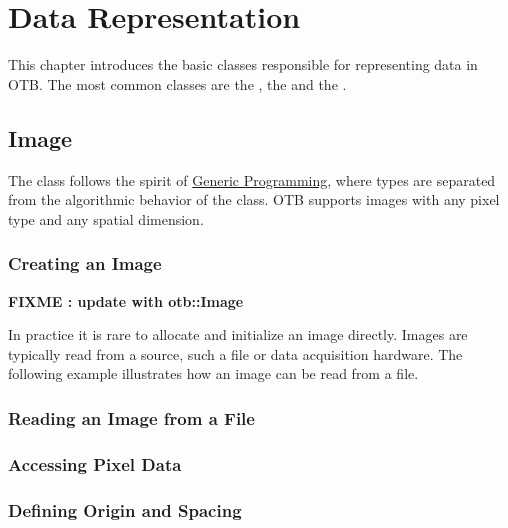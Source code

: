 \chapter{Data Representation}
\label{sec:DataRepresentation}


This chapter introduces the basic classes responsible
for representing data in OTB. The most common classes are the
, the  and the .

\section{Image}
\label{sec:ImageSection}

The  class follows the spirit of
\href{http://www.boost.org/more/generic_programming.html}{Generic
Programming}, where types are separated from the algorithmic behavior
of the class.  OTB supports images with any pixel type and any spatial
dimension.

\subsection{Creating an Image}\label{sec:CreatingAnImageSection}

\textbf{FIXME : update with otb::Image}


In practice it is rare to allocate and initialize an image directly.
Images are typically read from a source, such a file or data acquisition
hardware. The following example illustrates how an image can be read from
a file.




\subsection{Reading an Image from a File}
\label{sec:ReadingImageFromFile}







\subsection{Accessing Pixel Data}
\label{sec:AccessingImagePixelData}






\subsection{Defining Origin and Spacing}
\label{sec:DefiningImageOriginAndSpacing}

